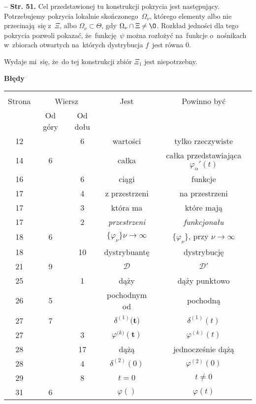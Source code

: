 \documentclass[a4paper,11pt]{article}
\newcommand{\mc}{\mathcal}
\newcommand{\bsym}{\boldsymbol}
\newcommand{\ra}{\rightarrow}
\newcommand{\al}{\alpha}
\newcommand{\del}{\delta}
\newcommand{\vp}{\varphi}
\newcommand{\Om}{\Omega}
\newcommand{\D}{\mc{D}}
\newcommand{\subs}{\subset}
\newcommand{\tb}{\textbf}
\newcommand{\noi}{\noindent}
\newcommand{\start}{\noi \tb{--} {}}
\newcommand{\Str}[1]{\tb{Str. #1.}}
\newcommand{\Center}[1]{\begin{center} #1 \end{center}}
\newcommand{\CenterTB}[1]{\Center{\tb{#1}}}
\begin{document}
\start \Str{51} Cel przedstawionej tu konstrukcji pokrycia jest
następujący. Potrzebujemy pokrycia lokalnie skończonego~$\Om_{ \nu }$,
którego elementy albo nie przecinają~się z~$\Xi$, albo
$\Om_{ \nu } \subs \Theta$, gdy $\Om_{ \nu } \cap \Xi \neq \O$.
Rozkład jedności dla tego pokrycia pozwoli pokazać,
że~funkcję~$\psi$ można rozłożyć na~funkcje o~nośnikach w~zbiorach
otwartych na~których dystrybucja $f$~jest równa $0$.

Wydaje mi~się, że~do tej konstrukcji zbiór $\Xi_{ 1 }$ jest niepotrzebny.

\newpage
\CenterTB{Błędy}
\begin{center}
  \begin{tabular}{|c|c|c|c|c|}
    \hline
    & \multicolumn{2}{c|}{} & & \\
    Strona & \multicolumn{2}{c|}{Wiersz}& Jest & Powinno być \\ \cline{2-3}
    & Od góry & Od dołu &  &  \\ \hline
    12 & & 6 & wartości & tylko rzeczywiste \\
    14 & 6 & & całka & całka przedstawiająca $\vp_{ \al }'( t )$ \\
    16 & & 6 & ciągi & funkcje \\
    17 & & 4 & z przestrzeni & na przestrzeni \\
    17 & & 3 & która ma & które mają \\
    17 & & 2 & \emph{przestrzeni} & \emph{funkcjonału} \\
    18 & 6 & & $\{ \vp_{ \nu } \}\nu \ra \infty$ & $\{ \vp_{ \nu } \}$,
                                                   przy $\nu \ra \infty$ \\
    18 & & 10 & dystrybuantę & dystrybucję \\
    21 & 9 & & $\D$ & $\D'$ \\
    25 & & 1 & dąży & dąży punktowo \\
    26 & 5 & & pochodnym od & pochodną \\
    27 & 7 & & $\del^{ ( 1 ) }\bsym{ ( t } )$ & $\del^{ ( 1 ) }( t )$ \\
    27 & & 3 & $\vp^{ ( k \bsym{ ) } }\bsym{ ( t ) } $
           & $\vp^{ ( k ) }( t )$ \\
    28 & & 17 & dążą & jednocześnie dążą \\
    28 & & 4 & $\del^{ ( 2 ) }( 0 )$ & $\vp^{ ( 2 ) }( 0 )$ \\
    29 & & 8 & $t = 0$ & $t \neq 0$ \\
    31 & 6 & & $\vp( )$ & $\vp( t )$ \\

\end{tabular}
\end{center}
\end{document}
